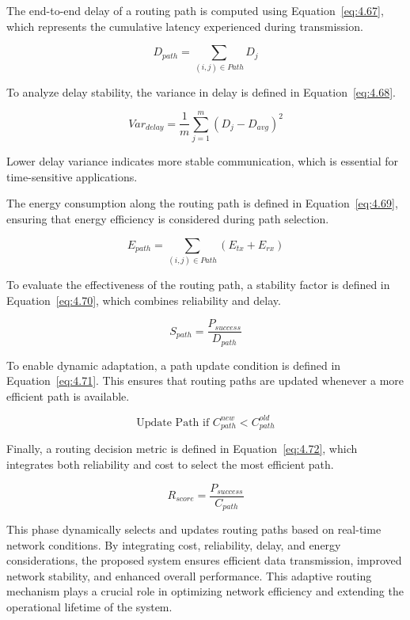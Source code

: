\documentclass[a4paper,fleqn]{cas-dc}
\numberwithin{equation}{section}
\begin{document}
The end-to-end delay of a routing path is computed using Equation~\ref{eq:4.67}, which represents the cumulative latency experienced during transmission.

\begin{equation}
D_{path} = \sum_{(i,j) \in Path} D_j
\label{eq:4.67}
\end{equation}

To analyze delay stability, the variance in delay is defined in Equation~\ref{eq:4.68}.

\begin{equation}
Var_{delay} = \frac{1}{m} \sum_{j=1}^{m} (D_j - D_{avg})^2
\label{eq:4.68}
\end{equation}

Lower delay variance indicates more stable communication, which is essential for time-sensitive applications.

The energy consumption along the routing path is defined in Equation~\ref{eq:4.69}, ensuring that energy efficiency is considered during path selection.

\begin{equation}
E_{path} = \sum_{(i,j) \in Path} (E_{tx} + E_{rx})
\label{eq:4.69}
\end{equation}

To evaluate the effectiveness of the routing path, a stability factor is defined in Equation~\ref{eq:4.70}, which combines reliability and delay.

\begin{equation}
S_{path} = \frac{P_{success}}{D_{path}}
\label{eq:4.70}
\end{equation}

To enable dynamic adaptation, a path update condition is defined in Equation~\ref{eq:4.71}. This ensures that routing paths are updated whenever a more efficient path is available.

\begin{equation}
\text{Update Path if } C_{path}^{new} < C_{path}^{old}
\label{eq:4.71}
\end{equation}

Finally, a routing decision metric is defined in Equation~\ref{eq:4.72}, which integrates both reliability and cost to select the most efficient path.

\begin{equation}
R_{score} = \frac{P_{success}}{C_{path}}
\label{eq:4.72}
\end{equation}

This phase dynamically selects and updates routing paths based on real-time network conditions. By integrating cost, reliability, delay, and energy considerations, the proposed system ensures efficient data transmission, improved network stability, and enhanced overall performance. This adaptive routing mechanism plays a crucial role in optimizing network efficiency and extending the operational lifetime of the system.
\end{document}
